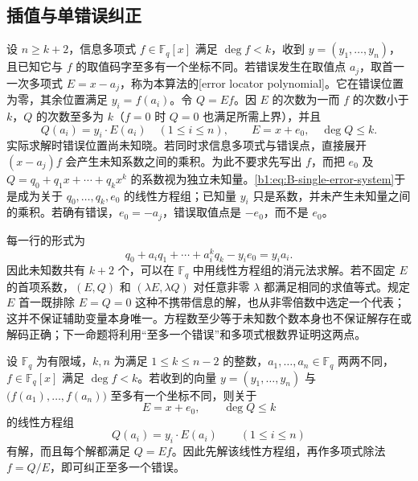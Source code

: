 \subsection{插值与单错误纠正}
\label{b1:subsec:B03:02}

\begin{samepage}
	设 \(n\geq k+2\)，信息多项式 \(f\in\mathbb F_q[x]\) 满足 \(\deg f<k\)，收到 \(y=(y_1,\ldots,y_n)\)，且已知它与 \(f\) 的取值码字至多有一个坐标不同。若错误发生在取值点 \(a_j\)，取首一一次多项式 \(E=x-a_j\)，称为本算法的[error locator polynomial]。它在错误位置为零，其余位置满足 \(y_i=f(a_i)\)。令 \(Q=Ef\)。因 \(E\) 的次数为一而 \(f\) 的次数小于 \(k\)，\(Q\) 的次数至多为 \(k\)（\(f=0\) 时 \(Q=0\) 也满足所需上界），并且
	\begin{equation}\label{b1:eq:B-single-error-system}
		Q(a_i)=y_i\cdot E(a_i)\quad(1\leq i\leq n),\qquad E=x+e_0,\quad \deg Q\leq k.
	\end{equation}
	实际求解时错误位置尚未知晓。若同时求信息多项式与错误点，直接展开 \((x-a_j)f\) 会产生未知系数之间的乘积。为此不要求先写出 \(f\)，而把 \(e_0\) 及 \(Q=q_0+q_1x+\cdots+q_kx^k\) 的系数视为独立未知量。\eqref{b1:eq:B-single-error-system}于是成为关于 \(q_0,\ldots,q_k,e_0\) 的线性方程组；已知量 \(y_i\) 只是系数，并未产生未知量之间的乘积。若确有错误，\(e_0=-a_j\)，错误取值点是 \(-e_0\)，而不是 \(e_0\)。
\end{samepage}

\ProseParagraphBreak
每一行的形式为
\[
	q_0+a_iq_1+\cdots+a_i^kq_k-y_i e_0=y_i a_i.
\]
因此未知数共有 \(k+2\) 个，可以在 \(\mathbb F_q\) 中用线性方程组的消元法求解。若不固定 \(E\) 的首项系数，\((E,Q)\) 和 \((\lambda E,\lambda Q)\) 对任意非零 \(\lambda\) 都满足相同的求值等式。规定 \(E\) 首一既排除 \(E=Q=0\) 这种不携带信息的解，也从非零倍数中选定一个代表；这并不保证辅助变量本身唯一。方程数至少等于未知数个数本身也不保证解存在或解码正确；下一命题将利用“至多一个错误”和多项式根数界证明这两点。

\begin{proposition}\label{b1:prop:B-single-error-decoding}
	设 \(\mathbb F_q\) 为有限域，\(k,n\) 为满足 \(1\leq k\leq n-2\) 的整数，\(a_1,\ldots,a_n\in\mathbb F_q\) 两两不同，\(f\in\mathbb F_q[x]\) 满足 \(\deg f<k\)。若收到的向量 \(y=(y_1,\ldots,y_n)\) 与 \(\bigl(f(a_1),\ldots,f(a_n)\bigr)\) 至多有一个坐标不同，则关于
	\[
		E=x+e_0,\qquad \deg Q\leq k
	\]
	的线性方程组
	\[
		Q(a_i)=y_i\cdot E(a_i)\qquad(1\leq i\leq n)
	\]
	有解，而且每个解都满足 \(Q=Ef\)。因此先解该线性方程组，再作多项式除法 \(f=Q/E\)，即可纠正至多一个错误。
\end{proposition}

